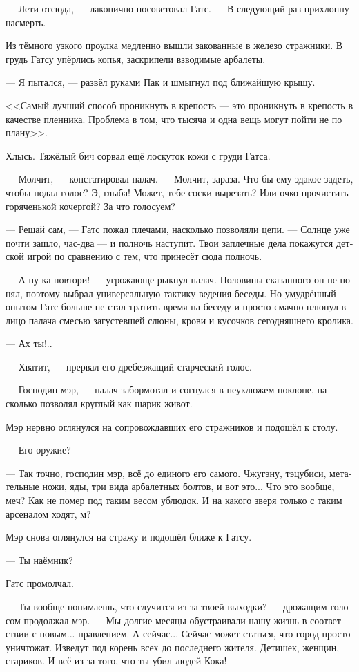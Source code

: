 \documentclass[a4paper,12pt,fleqn]{book}\usepackage{polyglossia}\setdefaultlanguage[babelshorthands=true]{russian}\setotherlanguage{english}\defaultfontfeatures{Ligatures=TeX,Mapping=tex-text}\usepackage{xcolor}\newcommand{\ml}[3]{#2}
\newcommand{\asterism}{\vspace{1em}{\centering\Large\bfseries$\ast~\ast~\ast$\par}\vspace{1em}}
\begin{document}
--- Лети отсюда, --- лаконично посоветовал Гатс.
--- В следующий раз прихлопну насмерть.

Из тёмного узкого проулка медленно вышли закованные в железо стражники.
В грудь Гатсу упёрлись копья, заскрипели взводимые арбалеты.

--- Я пытался, --- развёл руками Пак и шмыгнул под ближайшую крышу.

\asterism

<<Самый лучший способ проникнуть в крепость --- это проникнуть в крепость в качестве пленника.
Проблема в том, что тысяча и одна вещь могут пойти не по плану>>.

Хлысь.
Тяжёлый бич сорвал ещё лоскуток кожи с груди Гатса.

--- Молчит, --- констатировал палач.
--- Молчит, зараза.
Что бы ему эдакое задеть, чтобы подал голос?
Э, глыба!
Может, тебе соски вырезать?
Или очко прочистить горяченькой кочергой?
За что голосуем?

--- Решай сам, --- Гатс пожал плечами, насколько позволяли цепи.
--- Солнце уже почти зашло, час-два --- и полночь наступит.
Твои заплечные дела покажутся детской игрой по сравнению с тем, что принесёт сюда полночь.

--- А ну-ка повтори! --- угрожающе рыкнул палач.
Половины сказанного он не понял, поэтому выбрал универсальную тактику ведения беседы.
Но умудрённый опытом Гатс больше не стал тратить время на беседу и просто смачно плюнул в лицо палача смесью загустевшей слюны, крови и кусочков сегодняшнего кролика.

--- Ах ты!..

--- Хватит, --- прервал его дребезжащий старческий голос.

--- Господин мэр, --- палач забормотал и согнулся в неуклюжем поклоне, насколько позволял круглый как шарик живот.

Мэр нервно оглянулся на сопровождавших его стражников и подошёл к столу.

--- Его оружие?

--- Так точно, господин мэр, всё до единого его самого.
Чжугэну, тэцубиси, метательные ножи, яды, три вида арбалетных болтов, и вот это...
Что это вообще, меч?
Как не помер под таким весом ублюдок.
И на какого зверя только с таким арсеналом ходят, м?

Мэр снова оглянулся на стражу и подошёл ближе к Гатсу.

--- Ты наёмник?

Гатс промолчал.

--- Ты вообще понимаешь, что случится из-за твоей выходки? --- дрожащим голосом продолжал мэр.
--- Мы долгие месяцы обустраивали нашу жизнь в соответствии с новым... правлением.
А сейчас...
Сейчас может статься, что город просто уничтожат.
Изведут под корень всех до последнего жителя.
Детишек, женщин, стариков.
И всё из-за того, что ты убил людей Кока!
\end{document}
